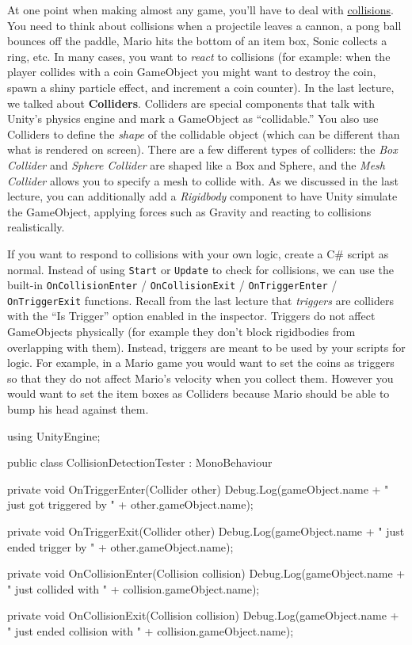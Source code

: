 \documentclass[11pt]{article}
\def\StartLineAt#1{\lstset{firstnumber=#1}}
\begin{document}
At one point when making almost any game, you'll have to deal with \underline{collisions}.  You need
to think about collisions when a projectile leaves a cannon, a pong ball bounces off the paddle, 
Mario hits the bottom of an item box, Sonic collects a ring, etc.  In many cases, you want to
\textit{react} to collisions (for example: when the player collides with a coin GameObject you
might want to destroy the coin, spawn a shiny particle effect, and increment a coin counter).
In the last lecture, we talked about \textbf{Colliders}.  Colliders are special components that
talk with Unity's physics engine and mark a GameObject as ``collidable.''  You also use Colliders
to define the \textit{shape} of the collidable object (which can be different than what is rendered
on screen).  There are a few different types of colliders: the \textit{Box Collider} and \textit{Sphere Collider}
are shaped like a Box and Sphere, and the \textit{Mesh Collider} allows you to specify a mesh to collide
with.  As we discussed in the last lecture, you can additionally add a \textit{Rigidbody} component
to have Unity simulate the GameObject, applying forces such as Gravity and reacting to collisions
realistically.

If you want to respond to collisions with your own logic, create a C\# script as normal.  Instead
of using \lstinline|Start| or \lstinline|Update| to check for collisions, we can use the built-in
\lstinline|OnCollisionEnter| / \lstinline|OnCollisionExit| / \lstinline|OnTriggerEnter| / 
\lstinline|OnTriggerExit| functions.  Recall from the last lecture that \textit{triggers} are
colliders with the ``Is Trigger'' option enabled in the inspector.  Triggers do not affect GameObjects
physically (for example they don't block rigidbodies from overlapping with them).  Instead, triggers are meant
to be used by your scripts for logic.  For example, in a Mario game you would want to set the coins
as triggers so that they do not affect Mario's velocity when you collect them.  However you would want
to set the item boxes as Colliders because Mario should be able to bump his head against them.

\StartLineAt{1}
\begin{csharp}
using UnityEngine;

public class CollisionDetectionTester : MonoBehaviour
{
    private void OnTriggerEnter(Collider other)
    {
        Debug.Log(gameObject.name + " just got triggered by " + other.gameObject.name);
    }

    private void OnTriggerExit(Collider other)
    {
        Debug.Log(gameObject.name + " just ended trigger by " + other.gameObject.name);
    }

    private void OnCollisionEnter(Collision collision)
    {
        Debug.Log(gameObject.name + " just collided with " + collision.gameObject.name);
    }

    private void OnCollisionExit(Collision collision)
    {
        Debug.Log(gameObject.name + " just ended collision with " + collision.gameObject.name);
    }
}
\end{csharp}
\end{document}
